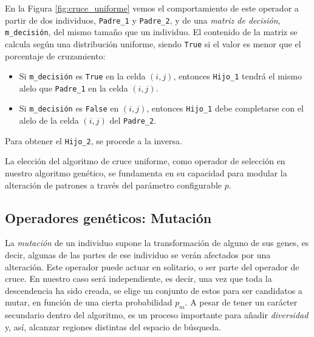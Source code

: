 \documentclass[12pt,a4paper]{book}
\begin{document}
En la Figura \ref{fig:cruce_uniforme} vemos el comportamiento de este operador a partir de dos individuos, \texttt{Padre\_1} y \texttt{Padre\_2}, y de una \textsl{matriz de decisión}, \texttt{m\_decisión}, del mismo tamaño que un individuo. El contenido de la matriz se calcula según una distribución uniforme, siendo \texttt{True} si el valor es menor que el porcentaje de cruzamiento:
\begin{itemize}
	\item Si \texttt{m\_decisión} es \texttt{True} en la celda $(i, j)$, entonces \texttt{Hijo\_1} tendrá el mismo alelo que \texttt{Padre\_1} en la celda $(i,j)$. 
	\item Si \texttt{m\_decisión} es \texttt{False} en $(i,j)$, entonces \texttt{Hijo\_1} debe completarse con el alelo de la celda $(i,j)$ del \texttt{Padre\_2}. 
\end{itemize}
Para obtener el \texttt{Hijo\_2}, se procede a la inversa. 

La elección del algoritmo de cruce uniforme, como operador de selección en nuestro algoritmo genético, se fundamenta en su capacidad para modular la alteración de patrones a través del parámetro configurable $p$. 

%
%

\subsection{Operadores genéticos: Mutación}
La \textsl{mutación} de un individuo supone la transformación de alguno de sus genes, es decir, algunas de las partes de ese individuo se verán afectados por una alteración. Este operador puede actuar en solitario, o ser parte del operador de cruce. En nuestro caso será independiente, es decir, una vez que toda la descendencia ha sido creada, se elige un conjunto de estos para ser candidatos a mutar, en función de una cierta probabilidad $p_m$. A pesar de tener un carácter secundario dentro del algoritmo, es un proceso importante para añadir \textsl{diversidad} y, así, alcanzar regiones distintas del espacio de búsqueda. 
\end{document}
